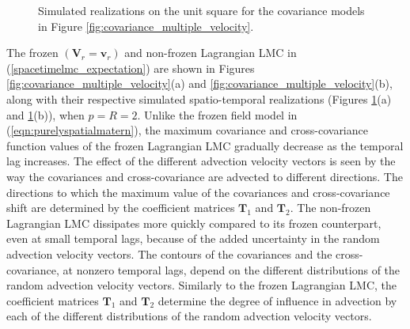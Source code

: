 \documentclass[12pt]{article}
\newcommand{\0}{\mathbf{0}}
\begin{document}
   \begin{figure}[htb!]
 \centering
    \qquad
    \captionsetup[subfloat]{margin=-2cm}
     \caption{Simulated realizations on the unit square for the covariance models in Figure \ref{fig:covariance_multiple_velocity}.}
    \label{fig:covariance_multiple_velocity_realizations}
   \end{figure}
   
The frozen $(\mathbf{V}_r=\mathbf{v}_r)$ and non-frozen Lagrangian LMC in (\ref{spacetimelmc_expectation}) are shown in Figures \ref{fig:covariance_multiple_velocity}(a) and \ref{fig:covariance_multiple_velocity}(b), along with their respective simulated spatio-temporal realizations (Figures \ref{fig:covariance_multiple_velocity_realizations}(a) and \ref{fig:covariance_multiple_velocity_realizations}(b)), when $p=R=2$. Unlike the frozen field model in (\ref{eqn:purelyspatialmatern}), the maximum covariance and  cross-covariance function values of the frozen Lagrangian LMC gradually decrease as the temporal lag increases. The effect of the different advection velocity vectors is seen by the way the covariances and cross-covariance are advected to different directions. The directions to which the maximum value of the covariances and cross-covariance shift are determined by the coefficient matrices $\mathbf{T}_1$ and $\mathbf{T}_2$. The non-frozen Lagrangian LMC dissipates more quickly compared to its frozen counterpart, even at small temporal lags, because of the added uncertainty in the random advection velocity vectors. The contours of the covariances and the cross-covariance, at nonzero temporal lags, depend on the different distributions of the random advection velocity vectors. Similarly to the frozen Lagrangian LMC, the coefficient matrices $\mathbf{T}_1$ and $\mathbf{T}_2$ determine the degree of influence in advection by each of the different distributions of the random advection velocity vectors.
\end{document}
